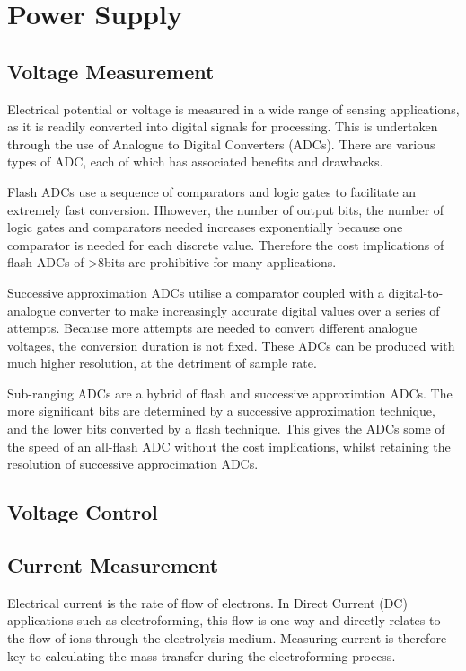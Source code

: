 \section{Power Supply}
\subsection{Voltage Measurement}\label{volt-meas}
Electrical potential or voltage is measured in a wide range of sensing applications, as it is readily converted into digital signals for processing. This is undertaken through the use of Analogue to Digital Converters (ADCs). There are various types of ADC, each of which has associated benefits and drawbacks.

Flash ADCs use a sequence of comparators and logic gates to facilitate an extremely fast conversion. Hhowever, the number of output bits, the number of logic gates and comparators needed increases exponentially because one comparator is needed for each discrete value. Therefore the cost implications of flash ADCs of >8bits are prohibitive for many applications.

Successive approximation ADCs utilise a comparator coupled with a digital-to-analogue converter to make increasingly accurate digital values over a series of attempts. Because more attempts are needed to convert different analogue voltages, the conversion duration is not fixed. These ADCs can be produced with much higher resolution, at the detriment of sample rate.

Sub-ranging ADCs are a hybrid of flash and successive approximtion ADCs. The more significant bits are determined by a successive approximation technique, and the lower bits converted by a flash technique. This gives the ADCs some of the speed of an all-flash ADC without the cost implications, whilst retaining the resolution of successive approcimation ADCs.


\subsection{Voltage Control}


\subsection{Current Measurement}
Electrical current is the rate of flow of electrons. In Direct Current (DC) applications such as electroforming, this flow is one-way and directly relates to the flow of ions through the electrolysis medium. Measuring current is therefore key to calculating the mass transfer during the electroforming process.

